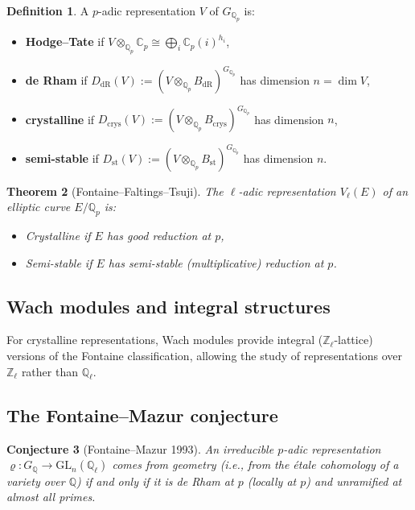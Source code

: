 \documentclass[a4paper,12pt]{amsart}
\newtheorem{theorem}{Theorem}[section]
\newtheorem{conjecture}[theorem]{Conjecture}
\theoremstyle{definition}
\newtheorem{definition}[theorem]{Definition}
\theoremstyle{remark}
\newcommand{\Q}{\mathbb{Q}}
\newcommand{\Zl}{\mathbb{Z}_\ell}
\newcommand{\Ql}{\mathbb{Q}_\ell}
\newcommand{\GL}{\mathrm{GL}}
\newcommand{\BdR}{B_{\mathrm{dR}}}
\newcommand{\Bcrys}{B_{\mathrm{crys}}}
\begin{document}
\begin{definition}
A $p$-adic representation $V$ of $G_{\Q_p}$ is:
\begin{itemize}
  \item \textbf{Hodge--Tate} if $V \otimes_{\Q_p} \mathbb{C}_p \cong \bigoplus_i \mathbb{C}_p(i)^{h_i}$,
  \item \textbf{de Rham} if $D_{\mathrm{dR}}(V) := (V \otimes_{\Q_p} \BdR)^{G_{\Q_p}}$ has dimension $n = \dim V$,
  \item \textbf{crystalline} if $D_{\mathrm{crys}}(V) := (V \otimes_{\Q_p} \Bcrys)^{G_{\Q_p}}$ has dimension $n$,
  \item \textbf{semi-stable} if $D_{\mathrm{st}}(V) := (V \otimes_{\Q_p} B_{\mathrm{st}})^{G_{\Q_p}}$ has dimension $n$.
\end{itemize}
\end{definition}

\begin{theorem}[Fontaine--Faltings--Tsuji]
\label{thm:fontaine-comparison}
The $\ell$-adic representation $V_\ell(E)$ of an elliptic curve $E/\Q_p$ is:
\begin{itemize}
  \item Crystalline if $E$ has good reduction at $p$,
  \item Semi-stable if $E$ has semi-stable (multiplicative) reduction at $p$.
\end{itemize}
\end{theorem}

\subsection{Wach modules and integral structures}

For crystalline representations, Wach modules provide integral ($\Zl$-lattice)
versions of the Fontaine classification, allowing the study of representations
over $\Zl$ rather than $\Ql$.

\subsection{The Fontaine--Mazur conjecture}

\begin{conjecture}[Fontaine--Mazur 1993]
An irreducible $p$-adic representation $\varrho\colon G_\Q \to \GL_n(\Ql)$ comes
from geometry (i.e., from the étale cohomology of a variety over $\Q$) if and only
if it is \emph{de Rham} at $p$ (locally at $p$) and unramified at almost all primes.
\end{conjecture}
\end{document}
